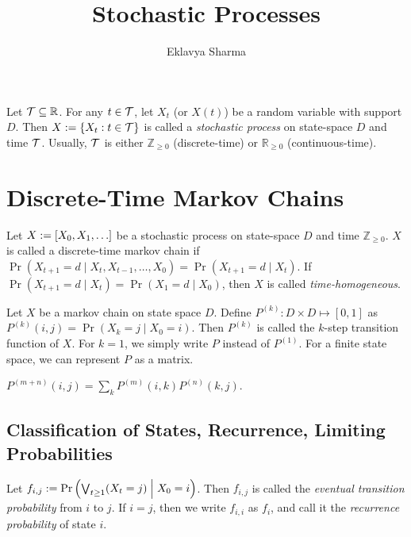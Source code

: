 \documentclass[a4paper, 12pt, fleqn]{article}
\author{Eklavya Sharma}
\date{\empty}
\title{Stochastic Processes}
\begin{document}
\maketitle
\setlength{\parskip}{0.2em}

\begin{definition}
Let $\mathcal{T} \subseteq \mathbb{R}$. For any $t \in \mathcal{T}$,
let $X_t$ (or $X(t)$) be a random variable with support $D$.
Then $X := \{X_t: t \in \mathcal{T}\}$ is called a
\emph{stochastic process} on state-space $D$ and time $\mathcal{T}$.
Usually, $\mathcal{T}$ is either $\mathbb{Z}_{\ge 0}$ (discrete-time)
or $\mathbb{R}_{\ge 0}$ (continuous-time).
\end{definition}

\section{Discrete-Time Markov Chains}

\begin{definition}
Let $X := [X_0, X_1, \ldots]$ be a stochastic process
on state-space $D$ and time $\mathbb{Z}_{\ge 0}$.
$X$ is called a discrete-time markov chain if
$\Pr(X_{t+1}=d \mid X_t, X_{t-1}, \ldots, X_0) = \Pr(X_{t+1}=d \mid X_t)$.
If $\Pr(X_{t+1}=d \mid X_t) = \Pr(X_1=d \mid X_0)$, then $X$ is called \emph{time-homogeneous}.
\end{definition}

\begin{definition}
Let $X$ be a markov chain on state space $D$.
Define $P^{(k)}: D \times D \mapsto [0, 1]$ as $P^{(k)}(i, j) = \Pr(X_k = j \mid X_0 = i)$.
Then $P^{(k)}$ is called the $k$-step transition function of $X$.
For $k = 1$, we simply write $P$ instead of $P^{(1)}$.
For a finite state space, we can represent $P$ as a matrix.
\end{definition}

\begin{lemma}
$P^{(m+n)}(i, j) = \sum_{k}P^{(m)}(i, k)P^{(n)}(k, j)$.
\end{lemma}

\subsection{Classification of States, Recurrence, Limiting Probabilities}

\begin{definition}
Let $f_{i,j} := \Pr\left(\bigvee_{t \ge 1} (X_t = j) \Bigm| X_0 = i\right)$.
Then $f_{i,j}$ is called the \emph{eventual transition probability} from $i$ to $j$.
If $i = j$, then we write $f_{i,i}$ as $f_i$, and call it
the \emph{recurrence probability} of state $i$.
\end{definition}
\end{document}

